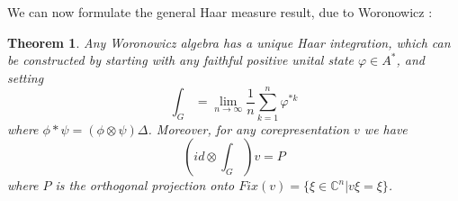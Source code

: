 \documentclass[12pt]{amsbook}
\newtheorem{theorem}{Theorem}[chapter]
\begin{document}
We can now formulate the general Haar measure result, due to Woronowicz \cite{wo1}:


\begin{theorem}
Any Woronowicz algebra has a unique Haar integration, which can be constructed by starting with any faithful positive unital state $\varphi\in A^*$, and setting
$$\int_G=\lim_{n\to\infty}\frac{1}{n}\sum_{k=1}^n\varphi^{*k}$$
where $\phi*\psi=(\phi\otimes\psi)\Delta$. Moreover, for any corepresentation $v$ we have
$$\left(id\otimes\int_G\right)v=P$$
where $P$ is the orthogonal projection onto $Fix(v)=\{\xi\in\mathbb C^n|v\xi=\xi\}$.
\end{theorem}
\end{document}
